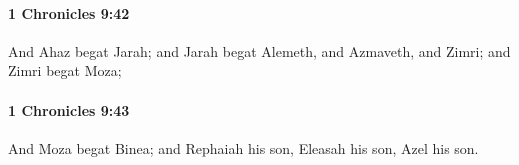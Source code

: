 		\paragraph{1 Chronicles 9:42} %
			\label{1CHRONICLES-9-42}

			And Ahaz begat Jarah; and Jarah begat Alemeth, and Azmaveth, and Zimri; and Zimri begat Moza;


		\paragraph{1 Chronicles 9:43} %
			\label{1CHRONICLES-9-43}

			And Moza begat Binea; and Rephaiah his son, Eleasah his son, Azel his son.


